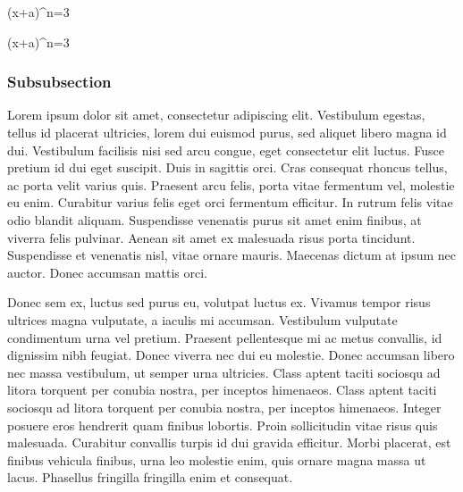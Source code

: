 \documentclass{thesis}
\begin{document}

\begin{thesisequation}[2]
	(x+a)^n=3
\end{thesisequation}


\begin{thesisequation*}
	(x+a)^n=3
\end{thesisequation*}

\subsubsection{Subsubsection}
Lorem ipsum dolor sit amet, consectetur adipiscing elit. Vestibulum egestas, tellus id placerat ultricies, lorem dui euismod purus, sed aliquet libero magna id dui. Vestibulum facilisis nisi sed arcu congue, eget consectetur elit luctus. Fusce pretium id dui eget suscipit. Duis in sagittis orci. Cras consequat rhoncus tellus, ac porta velit varius quis. Praesent arcu felis, porta vitae fermentum vel, molestie eu enim. Curabitur varius felis eget orci fermentum efficitur. In rutrum felis vitae odio blandit aliquam. Suspendisse venenatis purus sit amet enim finibus, at viverra felis pulvinar. Aenean sit amet ex malesuada risus porta tincidunt. Suspendisse et venenatis nisl, vitae ornare mauris. Maecenas dictum at ipsum nec auctor. Donec accumsan mattis orci. 

Donec sem ex, luctus sed purus eu, volutpat luctus ex. Vivamus tempor risus ultrices magna vulputate, a iaculis mi accumsan. Vestibulum vulputate condimentum urna vel pretium. Praesent pellentesque mi ac metus convallis, id dignissim nibh feugiat. Donec viverra nec dui eu molestie. Donec accumsan libero nec massa vestibulum, ut semper urna ultricies. Class aptent taciti sociosqu ad litora torquent per conubia nostra, per inceptos himenaeos. Class aptent taciti sociosqu ad litora torquent per conubia nostra, per inceptos himenaeos. Integer posuere eros hendrerit quam finibus lobortis. Proin sollicitudin vitae risus quis malesuada. Curabitur convallis turpis id dui gravida efficitur. Morbi placerat, est finibus vehicula finibus, urna leo molestie enim, quis ornare magna massa ut lacus. Phasellus fringilla fringilla enim et consequat.

\end{document}
